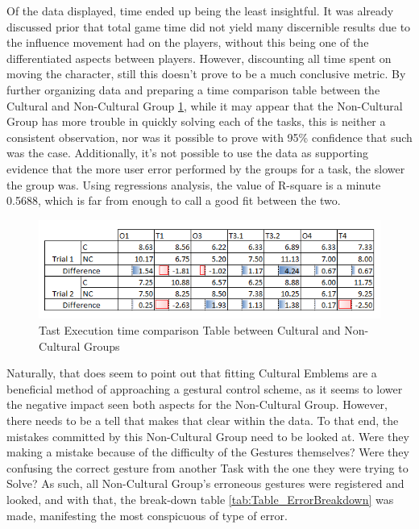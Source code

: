     Of the data displayed, time ended up being the least insightful. It was already discussed prior that total game time did not yield many discernible results due to the influence movement had on the players, without this being one of the differentiated aspects between players. However, discounting all time spent on moving the character, still this doesn’t prove to be a much conclusive metric. By further organizing data and preparing a time comparison table between the Cultural and Non-Cultural Group \ref{fig:FigureTimeComparisonTable}, while it may appear that the Non-Cultural Group has more trouble in quickly solving each of the tasks, this is neither a consistent observation, nor was it possible to prove with 95\% confidence that such was the case. Additionally, it’s not possible to use the data as supporting evidence that the more user error performed by the groups for a task, the slower the group was. Using regressions analysis, the value of R-square is a minute 0.5688, which is far from enough to call a good fit between the two.\\
    \begin{figure}[t]
        \centering
        \includegraphics[width=0.8\paperwidth]{figures/TimeComparisonTable.png}
        \caption{\label{fig:FigureTimeComparisonTable}Tast Execution time comparison Table between Cultural and Non-Cultural Groups}
    \end{figure}
    Naturally, that does seem to point out that fitting Cultural Emblems are a beneficial method of approaching a gestural control scheme, as it seems to lower the negative impact seen both aspects for the Non-Cultural Group. However, there needs to be a tell that makes that clear within the data. To that end, the mistakes committed by this Non-Cultural Group need to be looked at. Were they making a mistake because of the difficulty of the Gestures themselves? Were they confusing the correct gesture from another Task with the one they were trying to Solve? As such, all Non-Cultural Group’s erroneous gestures were registered and looked, and with that, the break-down table \ref{tab:Table_ErrorBreakdown} was made, manifesting the most conspicuous of type of error.\\
    
